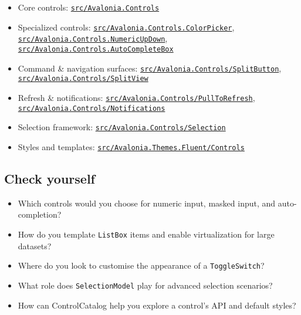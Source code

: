\begin{itemize}
\tightlist
\item
  Core controls:
  \href{https://github.com/AvaloniaUI/Avalonia/tree/master/src/Avalonia.Controls}{\passthrough{\lstinline!src/Avalonia.Controls!}}
\item
  Specialized controls:
  \href{https://github.com/AvaloniaUI/Avalonia/tree/master/src/Avalonia.Controls.ColorPicker}{\passthrough{\lstinline!src/Avalonia.Controls.ColorPicker!}},
  \href{https://github.com/AvaloniaUI/Avalonia/tree/master/src/Avalonia.Controls/NumericUpDown}{\passthrough{\lstinline!src/Avalonia.Controls.NumericUpDown!}},
  \href{https://github.com/AvaloniaUI/Avalonia/tree/master/src/Avalonia.Controls/AutoCompleteBox}{\passthrough{\lstinline!src/Avalonia.Controls.AutoCompleteBox!}}
\item
  Command \& navigation surfaces:
  \href{https://github.com/AvaloniaUI/Avalonia/tree/master/src/Avalonia.Controls/SplitButton}{\passthrough{\lstinline!src/Avalonia.Controls/SplitButton!}},
  \href{https://github.com/AvaloniaUI/Avalonia/tree/master/src/Avalonia.Controls/SplitView}{\passthrough{\lstinline!src/Avalonia.Controls/SplitView!}}
\item
  Refresh \& notifications:
  \href{https://github.com/AvaloniaUI/Avalonia/tree/master/src/Avalonia.Controls/PullToRefresh}{\passthrough{\lstinline!src/Avalonia.Controls/PullToRefresh!}},
  \href{https://github.com/AvaloniaUI/Avalonia/tree/master/src/Avalonia.Controls/Notifications}{\passthrough{\lstinline!src/Avalonia.Controls/Notifications!}}
\item
  Selection framework:
  \href{https://github.com/AvaloniaUI/Avalonia/tree/master/src/Avalonia.Controls/Selection}{\passthrough{\lstinline!src/Avalonia.Controls/Selection!}}
\item
  Styles and templates:
  \href{https://github.com/AvaloniaUI/Avalonia/tree/master/src/Avalonia.Themes.Fluent/Controls}{\passthrough{\lstinline!src/Avalonia.Themes.Fluent/Controls!}}
\end{itemize}

\subsection{Check yourself}\label{check-yourself-4}

\begin{itemize}
\tightlist
\item
  Which controls would you choose for numeric input, masked input, and
  auto-completion?
\item
  How do you template \passthrough{\lstinline!ListBox!} items and enable
  virtualization for large datasets?
\item
  Where do you look to customise the appearance of a
  \passthrough{\lstinline!ToggleSwitch!}?
\item
  What role does \passthrough{\lstinline!SelectionModel!} play for
  advanced selection scenarios?
\item
  How can ControlCatalog help you explore a control's API and default
  styles?
\end{itemize}

